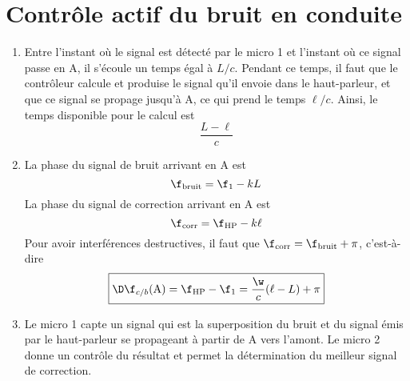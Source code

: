 \documentclass[a4paper, 12pt, final, garamond]{book}
\begin{document}
\section{Contrôle actif du bruit en conduite}
\begin{enumerate}
    \item Entre l'instant où le signal est détecté par le micro 1 et l'instant
        où ce signal passe en A, il s'écoule un temps égal à $L/c$. Pendant ce
        temps, il faut que le contrôleur calcule et produise le signal qu'il
        envoie dans le haut-parleur, et que ce signal se propage jusqu'à A, ce
        qui prend le temps $\ell/c$. Ainsi, le temps disponible pour le calcul
        est
        \[\boxed{\frac{L-\ell}{c}}\]
    \item La phase du signal de bruit arrivant en A est
        \[
            \f_{\rm bruit} = \f_1-kL
        \]
        La phase du signal de correction arrivant en A est
        \[
            \f_{\rm corr} = \f_{\rm HP} -k\ell
        \]
        Pour avoir interférences destructives, il faut que $\f_{\rm corr} =
        \f_{\rm bruit} + \pi$, c'est-à-dire
        \[
            \boxed{\D\f_{c/b}({\rm A})
                = \f_{\rm HP} - \f_1
                = \frac{\w}{c}(\ell-L)+\pi}
        \]
    \item Le micro 1 capte un signal qui est la superposition du bruit et du
        signal émis par le haut-parleur se propageant à partir de A vers
        l'amont. Le micro 2 donne un contrôle du résultat et permet la
        détermination du meilleur signal de correction.
\end{enumerate}
\end{document}
